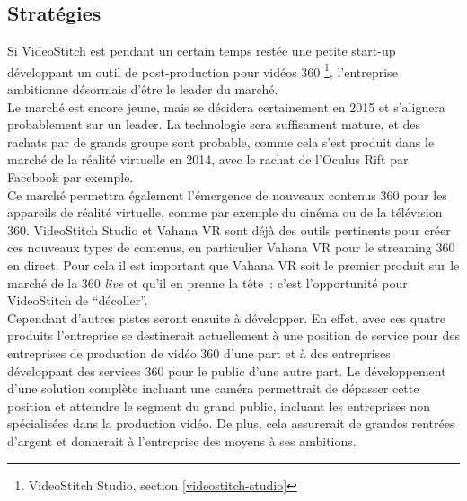\subsection{Stratégies}
Si VideoStitch est pendant un certain temps restée une petite start-up développant
un outil de post-production pour vidéos 360 
\footnote{VideoStitch Studio, section \ref{videostitch-studio}}, 
l'entreprise ambitionne désormais d'être le leader du marché.\\
Le marché est encore jeune, mais se décidera certainement en 2015 et s'alignera
probablement sur un leader. La technologie sera suffisament mature, et des rachats
par de grands groupe sont probable, comme cela s'est produit dans le marché de la
réalité virtuelle en 2014, avec le rachat de l'Oculus Rift par Facebook 
\cite{facebook-vr} par exemple.\\
Ce marché permettra également l'émergence de nouveaux contenus 360 pour les appareils
de réalité virtuelle, comme par exemple du cinéma ou de la télévision 360.
VideoStitch Studio et Vahana VR sont déjà des outils pertinents pour créer ces 
nouveaux types de contenus, en particulier Vahana VR pour le streaming 360 en direct.
Pour cela il est important que Vahana VR soit le premier produit sur le marché
de la 360 \textit{live} et qu'il en prenne la tête~: c'est l'opportunité pour VideoStitch
de \enquote{décoller}.\\
\newline
Cependant d'autres pistes seront ensuite à développer. En effet, avec ces quatre produits
l'entreprise se destinerait actuellement à une position de service pour des entreprises de production
de vidéo 360 d'une part et à des entreprises développant des services 360 pour le
public d'une autre part. Le développement d'une solution complète incluant une 
caméra permettrait de dépasser cette position et atteindre le segment du grand public, incluant
les entreprises non spécialisées dans la production vidéo.
De plus, cela assurerait de grandes rentrées d'argent et donnerait à l'entreprise des
moyens à ses ambitions.
